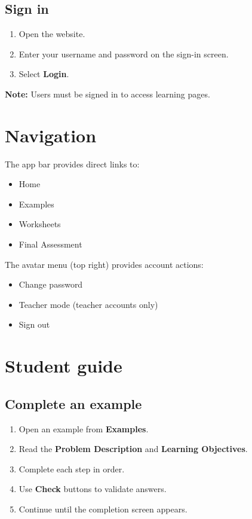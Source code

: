 \documentclass[11pt,a4paper]{article}
\begin{document}
\subsection{Sign in}
\begin{enumerate}
  \item Open the website.
  \item Enter your username and password on the sign-in screen.
  \item Select \textbf{Login}.
\end{enumerate}

\textbf{Note:} Users must be signed in to access learning pages.

\section{Navigation}
The app bar provides direct links to:
\begin{itemize}
  \item Home
  \item Examples
  \item Worksheets
  \item Final Assessment
\end{itemize}

The avatar menu (top right) provides account actions:
\begin{itemize}
  \item Change password
  \item Teacher mode (teacher accounts only)
  \item Sign out
\end{itemize}

\section{Student guide}
\subsection{Complete an example}
\begin{enumerate}
  \item Open an example from \textbf{Examples}.
  \item Read the \textbf{Problem Description} and \textbf{Learning Objectives}.
  \item Complete each step in order.
  \item Use \textbf{Check} buttons to validate answers.
  \item Continue until the completion screen appears.
\end{enumerate}
\end{document}
